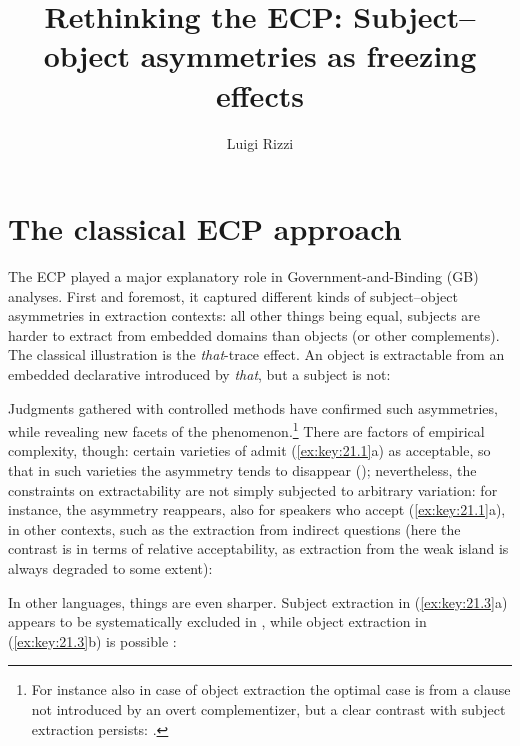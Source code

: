 \documentclass[output=paper]{langsci/langscibook}
\author{Luigi Rizzi}
\title{Rethinking the ECP: Subject--object asymmetries as freezing effects}
\begin{document}
\glsresetall
\maketitle

\section{The classical ECP approach}

The \gls{ECP} played a major explanatory role in
Govern\-ment-and-Binding (\gls{GB}) analyses.  First and foremost,
it captured different kinds of subject--object asymmetries in extraction
contexts: all other things being equal, subjects are harder to extract from
embedded domains than objects (or other complements).  The classical
illustration is the \emph{that}-trace effect. An object is extractable from an
embedded declarative introduced by \emph{that}, but a subject is not:

\ea%
    \label{ex:key:21.1}
    \z
\z
%
Judgments gathered with controlled methods have confirmed such asymmetries,
while revealing new facets of the phenomenon.\footnote{For instance also in
    case of object extraction the optimal case is from a clause not introduced
    by an overt complementizer, but a clear contrast with
    subject extraction persists: \citet{Schippers2012}.} There are factors of
    empirical complexity, though: certain varieties of  admit
    (\ref{ex:key:21.1}a) as acceptable, so that in such varieties the asymmetry
    tends to disappear (\citealt{Sobin2002,Schippers2012}); nevertheless, the
    constraints on extractability are not simply subjected to arbitrary
    variation: for instance, the asymmetry reappears, also for speakers who
    accept (\ref{ex:key:21.1}a), in other contexts, such as the extraction from
    indirect questions (here the contrast is in terms of relative
    acceptability, as extraction from the weak island is always
    degraded to some extent):

\ea%
    \label{ex:key:21.2}
    \z
\z
%
In other languages, things are even sharper. Subject extraction in
(\ref{ex:key:21.3}a) appears to be systematically excluded in ,
while object extraction in (\ref{ex:key:21.3}b) is possible
\citep{Berthelot2017}:
\end{document}
